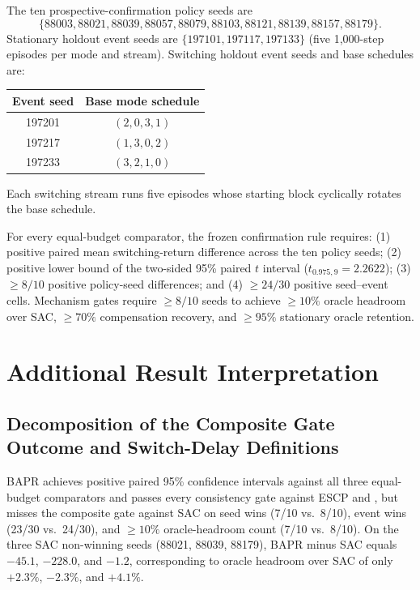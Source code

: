 The ten prospective-confirmation policy seeds are
\begin{equation}
\{88003,88021,88039,88057,88079,88103,88121,88139,88157,88179\}.
\end{equation}
Stationary holdout event seeds are $\{197101,197117,197133\}$ (five 1,000-step episodes per mode and stream). Switching holdout event seeds and base schedules are:
\begin{center}
\begin{tabular}{cc}
\toprule
Event seed & Base mode schedule \\
\midrule
197201 & $(2,0,3,1)$ \\
197217 & $(1,3,0,2)$ \\
197233 & $(3,2,1,0)$ \\
\bottomrule
\end{tabular}
\end{center}
Each switching stream runs five episodes whose starting block cyclically rotates the base schedule.

For every equal-budget comparator, the frozen confirmation rule requires: (1) positive paired mean switching-return difference across the ten policy seeds; (2) positive lower bound of the two-sided 95\% paired $t$ interval ($t_{0.975,9}=2.2622$); (3) $\ge 8/10$ positive policy-seed differences; and (4) $\ge 24/30$ positive seed--event cells. Mechanism gates require $\ge 8/10$ seeds to achieve $\ge 10\%$ oracle headroom over SAC, $\ge 70\%$ compensation recovery, and $\ge 95\%$ stationary oracle retention.

\section{Additional Result Interpretation}
\label{app:additional_results}

\subsection{Decomposition of the Composite Gate Outcome and Switch-Delay Definitions}

BAPR achieves positive paired 95\% confidence intervals against all three equal-budget comparators and passes every consistency gate against ESCP and \resacbaseline{}, but misses the composite gate against SAC on seed wins (7/10 vs.\ 8/10), event wins (23/30 vs.\ 24/30), and $\ge 10\%$ oracle-headroom count (7/10 vs.\ 8/10). On the three SAC non-winning seeds (88021, 88039, 88179), BAPR minus SAC equals $-45.1$, $-228.0$, and $-1.2$, corresponding to oracle headroom over SAC of only $+2.3\%$, $-2.3\%$, and $+4.1\%$.

